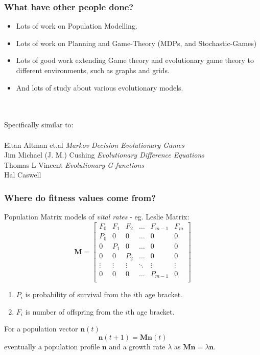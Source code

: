\documentclass{beamer}
\begin{document}
\begin{frame}
\frametitle{What have other people done?}
\begin{itemize}
\item Lots of work on Population Modelling.
\item Lots of work on Planning and Game-Theory (MDPs, and Stochastic-Games)
\item Lots of good work extending Game theory and evolutionary game theory to different environments, such as graphs and grids.
\item And lots of study about various evolutionary models.
\end{itemize}
\\\-\\
Specifically similar to: \\\-\\
Eitan Altman et.al \textit{Markov Decision Evolutionary Games}\\
Jim Michael (J. M.) Cushing \textit{Evolutionary Difference Equations}\\
Thomas L Vincent \textit{Evolutionary G-functions}\\
Hal Caswell\\
\end{frame}



\begin{frame}
\frametitle{Where do fitness values come from?}
Population Matrix models of \textit{vital rates} - eg. Leslie Matrix:
\begin{equation*}
\mathbf{M}=\begin{bmatrix}
    F_0 & F_1 & F_2 & \dots & F_{m-1} & F_m  \\
    P_0 &  0  &  0  & \dots &  0      &  0   \\
     0  & P_1 &  0  & \dots &  0      &  0   \\
     0  &  0  & P_2 & \dots &  0      &  0   \\
    \vdots & \vdots & \vdots & \ddots & \vdots & \vdots \\
     0  &  0  &  0  & \dots  & P_{m-1} &  0   \\
\end{bmatrix}
\end{equation*}
\begin{enumerate}
\item $P_i$ is probability of survival from the $i$th age bracket.\\
\item $F_i$ is number of offspring from the $i$th age bracket.\\
\end{enumerate}
For a population vector $\mathbf{n}(t)$ $$\mathbf{n}(t+1)=\mathbf{M}\mathbf{n}(t)$$
eventually a population profile $\mathbf{n}$ and a growth rate $\lambda$ as $\mathbf{M}\mathbf{n}=\lambda \mathbf{n}$.
\end{frame}
\end{document}
